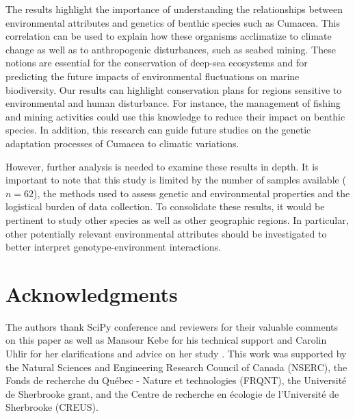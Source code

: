 The results highlight the importance of understanding the relationships between environmental attributes and genetics of benthic species such as Cumacea. This correlation can be used to explain how these organisms acclimatize to climate change as well as to anthropogenic disturbances, such as seabed mining. These notions are essential for the conservation of deep-sea ecosystems and for predicting the future impacts of environmental fluctuations on marine biodiversity. Our results can highlight conservation plans for regions sensitive to environmental and human disturbance. For instance, the management of fishing and mining activities could use this knowledge to reduce their impact on benthic species. In addition, this research can guide future studies on the genetic adaptation processes of Cumacea to climatic variations.

However, further analysis is needed to examine these results in depth. It is important to note that this study is limited by the number of samples available ($n=62$), the methods used to assess genetic and environmental properties and the logistical burden of data collection. To consolidate these results, it would be pertinent to study other species as well as other geographic regions. In particular, other potentially relevant environmental attributes should be investigated to better interpret genotype-environment interactions.

\section{Acknowledgments}\label{acknowledgments}

The authors thank SciPy conference and reviewers for their valuable comments on this paper as well as Mansour Kebe for his technical support and Carolin Uhlir for her clarifications and advice on her study \citep{uhlir_adding_2021}. This work was supported by the Natural Sciences and Engineering Research Council of Canada (NSERC), the Fonds de recherche du Québec - Nature et technologies (FRQNT), the Université de Sherbrooke grant, and the Centre de recherche en écologie de l’Université de Sherbrooke (CREUS).
